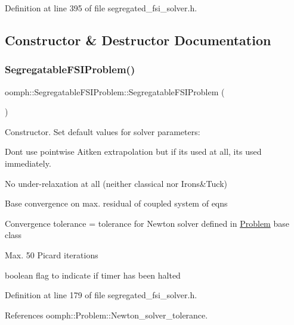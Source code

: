 Definition at line 395 of file segregated\+\_\+fsi\+\_\+solver.\+h.



\subsection{Constructor \& Destructor Documentation}
\mbox{\label{classoomph_1_1SegregatableFSIProblem_aabbe220c15e7a348a28d54be805ca8d8}} 
\subsubsection{\texorpdfstring{Segregatable\+F\+S\+I\+Problem()}{SegregatableFSIProblem()}}
{\footnotesize\ttfamily oomph\+::\+Segregatable\+F\+S\+I\+Problem\+::\+Segregatable\+F\+S\+I\+Problem (\begin{DoxyParamCaption}{ }\end{DoxyParamCaption})\hspace{0.3cm}{\ttfamily [inline]}}



Constructor. Set default values for solver parameters\+: 


\begin{DoxyItemize}
\item Don\textquotesingle{}t use pointwise Aitken extrapolation but if it\textquotesingle{}s used at all, it\textquotesingle{}s used immediately.
\item No under-\/relaxation at all (neither classical nor Irons\&Tuck)
\item Base convergence on max. residual of coupled system of eqns
\item Convergence tolerance = tolerance for Newton solver defined in \hyperlink{classoomph_1_1Problem}{Problem} base class
\item Max. 50 Picard iterations 
\end{DoxyItemize}boolean flag to indicate if timer has been halted 

Definition at line 179 of file segregated\+\_\+fsi\+\_\+solver.\+h.



References oomph\+::\+Problem\+::\+Newton\+\_\+solver\+\_\+tolerance.

